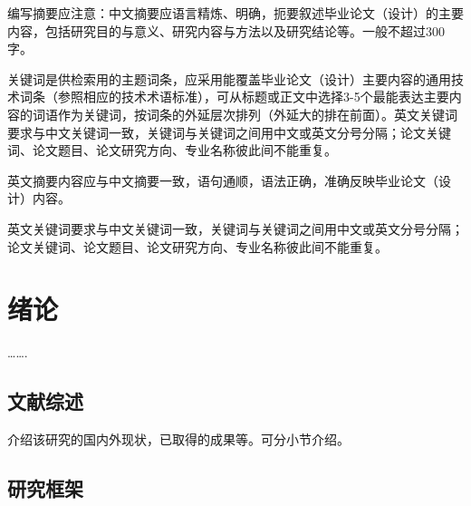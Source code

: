 \documentclass[fontset=auto]{jnuthesis}
\begin{document}
\makeblankcover

\makestatement

\begin{zhabstract}
[单击此处键入摘要内容。]

编写摘要应注意：中文摘要应语言精炼、明确，扼要叙述毕业论文（设计）的主要内容，包括研究目的与意义、研究内容与方法以及研究结论等。一般不超过300字。


关键词是供检索用的主题词条，应采用能覆盖毕业论文（设计）主要内容的通用技术词条（参照相应的技术术语标准），可从标题或正文中选择3-5个最能表达主要内容的词语作为关键词，按词条的外延层次排列（外延大的排在前面）。英文关键词要求与中文关键词一致，关键词与关键词之间用中文或英文分号分隔；论文关键词、论文题目、论文研究方向、专业名称彼此间不能重复。
\end{zhabstract}

\begin{enabstract}
[单击此处键入英文摘要内容。]

英文摘要内容应与中文摘要一致，语句通顺，语法正确，准确反映毕业论文（设计）内容。

\enkeywords{\hspace{2\ccwd};\hspace{3\ccwd};}

英文关键词要求与中文关键词一致，关键词与关键词之间用中文或英文分号分隔；论文关键词、论文题目、论文研究方向、专业名称彼此间不能重复。
\end{enabstract}

\tableofcontents

\jnumainmatter

\chapter{绪论}

…….

\section{文献综述}

介绍该研究的国内外现状，已取得的成果等。可分小节介绍。

\section{研究框架}
\end{document}
